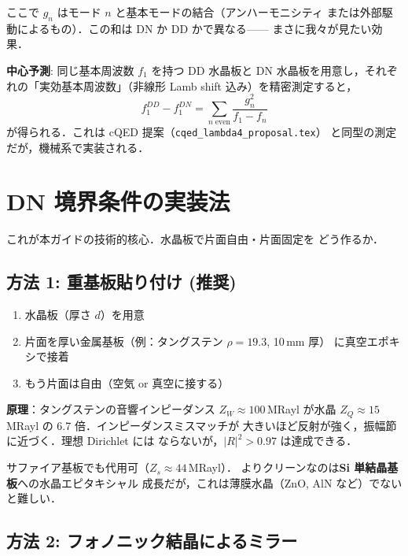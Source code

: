 \documentclass[11pt,a4paper]{article}
\begin{document}
ここで $g_n$ はモード $n$ と基本モードの結合（アンハーモニシティ
または外部駆動によるもの）．この和は DN か DD かで異なる——
まさに我々が見たい効果．

\begin{tcolorbox}[colback=yellow!5,colframe=orange!60!black]
\textbf{中心予測}: 同じ基本周波数 $f_1$ を持つ DD 水晶板と
DN 水晶板を用意し，それぞれの「実効基本周波数」（非線形 Lamb
shift 込み）を精密測定すると，
\begin{equation}
  f_1^{DD} - f_1^{DN} = \sum_{n\;\text{even}} \frac{g_n^2}{f_1 - f_n}
\end{equation}
が得られる．これは cQED 提案（\texttt{cqed\_lambda4\_proposal.tex}）
と同型の測定だが，機械系で実装される．
\end{tcolorbox}

\section{DN 境界条件の実装法}

これが本ガイドの技術的核心．水晶板で片面自由・片面固定を
どう作るか．

\subsection{方法 1: 重基板貼り付け (\textbf{推奨})}

\begin{enumerate}
\item 水晶板（厚さ $d$）を用意
\item 片面を厚い金属基板（例：タングステン $\rho=19.3$, 10\,mm 厚）
に真空エポキシで接着
\item もう片面は自由（空気 or 真空に接する）
\end{enumerate}

\textbf{原理}：タングステンの音響インピーダンス $Z_W \approx 100$\,MRayl
が水晶 $Z_Q \approx 15$\,MRayl の 6.7 倍．インピーダンスミスマッチが
大きいほど反射が強く，振幅節に近づく．理想 Dirichlet には
ならないが，$|R|^2 > 0.97$ は達成できる．

サファイア基板でも代用可（$Z_s \approx 44$\,MRayl）．
よりクリーンなのは\textbf{Si 単結晶基板}への水晶エピタキシャル
成長だが，これは薄膜水晶（ZnO, AlN など）でないと難しい．

\subsection{方法 2: フォノニック結晶によるミラー}
\end{document}
